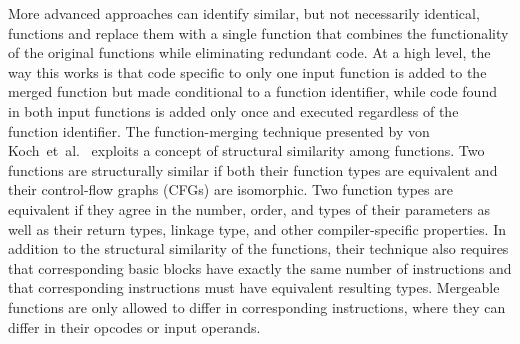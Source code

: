 More advanced approaches can identify similar, but not necessarily identical, functions and replace them with a single function that combines the functionality of the original functions while eliminating redundant code.
At a high level, the way this works is that code specific to only one input function is added to the merged function but made conditional to a function identifier, while code found in both input functions is added only once and executed regardless of the function identifier.
The function-merging technique presented by von Koch~et~al.~\cite{edler14} exploits a concept of structural similarity among functions.
Two functions are structurally similar if both their function types are equivalent
and their control-flow graphs (CFGs) are isomorphic.
Two function types are equivalent if they agree in the number, order, and types
of their parameters as well as
their return types, linkage type, and other compiler-specific properties.
In addition to the structural similarity of the functions, their technique also
requires that corresponding basic blocks have exactly the same number of instructions
and that corresponding instructions must have equivalent resulting types.
Mergeable functions are only allowed to differ in corresponding instructions,
where they can differ in their opcodes or input operands.




